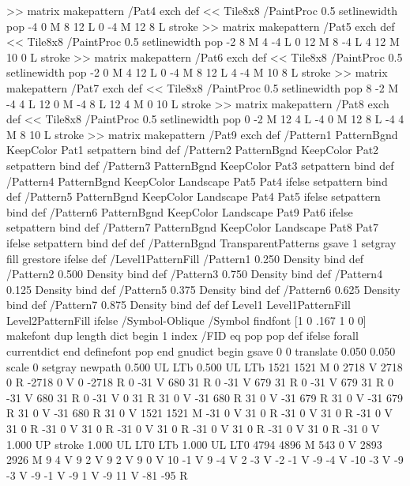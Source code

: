 {{{>> matrix makepattern
/Pat4 exch def
<< Tile8x8
 /PaintProc {0.5 setlinewidth pop -4 0 M 8 12 L
	0 -4 M 12 8 L stroke}
>> matrix makepattern
/Pat5 exch def
<< Tile8x8
 /PaintProc {0.5 setlinewidth pop -2 8 M 4 -4 L
	0 12 M 8 -4 L 4 12 M 10 0 L stroke}
>> matrix makepattern
/Pat6 exch def
<< Tile8x8
 /PaintProc {0.5 setlinewidth pop -2 0 M 4 12 L
	0 -4 M 8 12 L 4 -4 M 10 8 L stroke}
>> matrix makepattern
/Pat7 exch def
<< Tile8x8
 /PaintProc {0.5 setlinewidth pop 8 -2 M -4 4 L
	12 0 M -4 8 L 12 4 M 0 10 L stroke}
>> matrix makepattern
/Pat8 exch def
<< Tile8x8
 /PaintProc {0.5 setlinewidth pop 0 -2 M 12 4 L
	-4 0 M 12 8 L -4 4 M 8 10 L stroke}
>> matrix makepattern
/Pat9 exch def
/Pattern1 {PatternBgnd KeepColor Pat1 setpattern} bind def
/Pattern2 {PatternBgnd KeepColor Pat2 setpattern} bind def
/Pattern3 {PatternBgnd KeepColor Pat3 setpattern} bind def
/Pattern4 {PatternBgnd KeepColor Landscape {Pat5} {Pat4} ifelse setpattern} bind def
/Pattern5 {PatternBgnd KeepColor Landscape {Pat4} {Pat5} ifelse setpattern} bind def
/Pattern6 {PatternBgnd KeepColor Landscape {Pat9} {Pat6} ifelse setpattern} bind def
/Pattern7 {PatternBgnd KeepColor Landscape {Pat8} {Pat7} ifelse setpattern} bind def
} def
%
%
%
/PatternBgnd {
  TransparentPatterns {} {gsave 1 setgray fill grestore} ifelse
} def
%
%
/Level1PatternFill {
/Pattern1 {0.250 Density} bind def
/Pattern2 {0.500 Density} bind def
/Pattern3 {0.750 Density} bind def
/Pattern4 {0.125 Density} bind def
/Pattern5 {0.375 Density} bind def
/Pattern6 {0.625 Density} bind def
/Pattern7 {0.875 Density} bind def
} def
%
%
Level1 {Level1PatternFill} {Level2PatternFill} ifelse
%
/Symbol-Oblique /Symbol findfont [1 0 .167 1 0 0] makefont
dup length dict begin {1 index /FID eq {pop pop} {def} ifelse} forall
currentdict end definefont pop
end
gnudict begin
gsave
0 0 translate
0.050 0.050 scale
0 setgray
newpath
0.500 UL
LTb
0.500 UL
LTb
1521 1521 M
0 2718 V
2718 0 R
-2718 0 V
0 -2718 R
0 -31 V
680 31 R
0 -31 V
679 31 R
0 -31 V
679 31 R
0 -31 V
680 31 R
0 -31 V
0 31 R
31 0 V
-31 680 R
31 0 V
-31 679 R
31 0 V
-31 679 R
31 0 V
-31 680 R
31 0 V
1521 1521 M
-31 0 V
31 0 R
-31 0 V
31 0 R
-31 0 V
31 0 R
-31 0 V
31 0 R
-31 0 V
31 0 R
-31 0 V
31 0 R
-31 0 V
31 0 R
-31 0 V
1.000 UP
stroke
1.000 UL
LT0
LTb
1.000 UL
LT0
4794 4896 M
543 0 V
2893 2926 M
9 4 V
9 2 V
9 2 V
9 0 V
10 -1 V
9 -4 V
2 -3 V
-2 -1 V
-9 -4 V
-10 -3 V
-9 -3 V
-9 -1 V
-9 1 V
-9 11 V
-81 -95 R
}}
